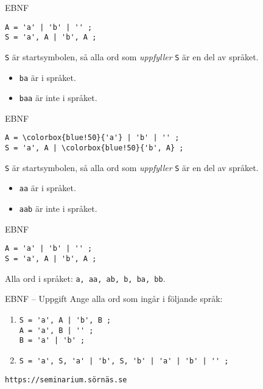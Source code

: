 \documentclass{beamer}
\begin{document}
  \begin{frame}[fragile]{EBNF}
    \begin{Verbatim}[commandchars=\\\{\}]
A = 'a' | 'b' | '' ;
S = 'a', A | 'b', A ;
    \end{Verbatim}

    \texttt{S} är startsymbolen, så alla ord som \emph{uppfyller} \texttt{S} är
    en del av språket.

    \begin{itemize}
      \item \texttt{ba} är i språket.
      \item \texttt{baa} är inte i språket.
    \end{itemize}

  \end{frame}

  \begin{frame}[fragile]{EBNF}
    \begin{Verbatim}[commandchars=\\\{\}]
A = \colorbox{blue!50}{'a'} | 'b' | '' ;
S = 'a', A | \colorbox{blue!50}{'b', A} ;
    \end{Verbatim}

    \texttt{S} är startsymbolen, så alla ord som \emph{uppfyller} \texttt{S} är
    en del av språket.

    \begin{itemize}
      \item \texttt{aa} är i språket.
      \item \texttt{aab} är inte i språket.
    \end{itemize}

  \end{frame}

  \begin{frame}[fragile]{EBNF}
    \begin{Verbatim}[commandchars=\\\{\}]
A = 'a' | 'b' | '' ;
S = 'a', A | 'b', A ;
    \end{Verbatim}

    Alla ord i språket: \texttt{a, aa, ab, b, ba, bb}.
  \end{frame}

  \begin{frame}[fragile]{EBNF -- Uppgift}
    Ange alla ord som ingår i följande språk:

    \begin{enumerate}
      \item \begin{Verbatim}
S = 'a', A | 'b', B ;
A = 'a', B | '' ;
B = 'a' | 'b' ;
      \end{Verbatim}
      \item \begin{Verbatim}
S = 'a', S, 'a' | 'b', S, 'b' | 'a' | 'b' | '' ;
      \end{Verbatim}
    \end{enumerate}

    \texttt{https://seminarium.sörnäs.se}

  \end{frame}
\end{document}
